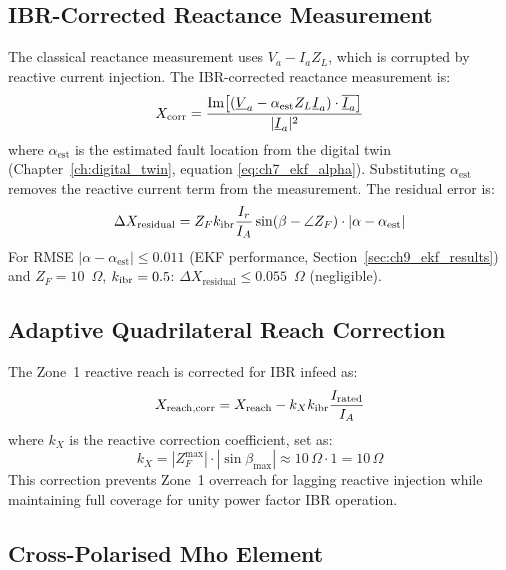 \subsection{IBR-Corrected Reactance Measurement}

The classical reactance measurement uses $V_a - I_a Z_L$, which is
corrupted by reactive current injection. The IBR-corrected reactance
measurement is:
\begin{equation}
  X_\mathrm{corr} = \frac{\mathrm{Im}\!\left[(\underline{V}_a
    - \alpha_\mathrm{est} Z_L \underline{I}_a) \cdot
    \overline{\underline{I}_a}\right]}{|\underline{I}_a|^2}
  \label{eq:ch5_xcorr}
\end{equation}
where $\alpha_\mathrm{est}$ is the estimated fault location from the
digital twin (Chapter~\ref{ch:digital_twin}, equation \ref{eq:ch7_ekf_alpha}).
Substituting $\alpha_\mathrm{est}$ removes the reactive current term
from the measurement. The residual error is:
\begin{equation}
  \Delta X_\mathrm{residual} = Z_F k_\mathrm{ibr} \frac{I_r}{I_A}
    \sin(\beta - \angle Z_F) \cdot |\alpha - \alpha_\mathrm{est}|
  \label{eq:ch5_xcorr_error}
\end{equation}
For RMSE $|\alpha - \alpha_\mathrm{est}| \leq 0.011$ (EKF performance,
Section~\ref{sec:ch9_ekf_results}) and $Z_F = 10$~$\Omega$,
$k_\mathrm{ibr} = 0.5$: $\Delta X_\mathrm{residual} \leq 0.055$~$\Omega$ (negligible).

\subsection{Adaptive Quadrilateral Reach Correction}

The Zone~1 reactive reach is corrected for IBR infeed as:
\begin{equation}
  X_\mathrm{reach,corr} = X_\mathrm{reach} - k_X k_\mathrm{ibr} \frac{I_\mathrm{rated}}{I_A}
  \label{eq:ch5_xreach_corr}
\end{equation}
where $k_X$ is the reactive correction coefficient, set as:
\begin{equation}
  k_X = |Z_F^\mathrm{max}| \cdot |\sin\beta_\mathrm{max}|
  \approx 10\,\Omega \cdot 1 = 10\,\Omega
  \label{eq:ch5_kx}
\end{equation}
This correction prevents Zone~1 overreach for lagging reactive injection
while maintaining full coverage for unity power factor IBR operation.

\subsection{Cross-Polarised Mho Element}


